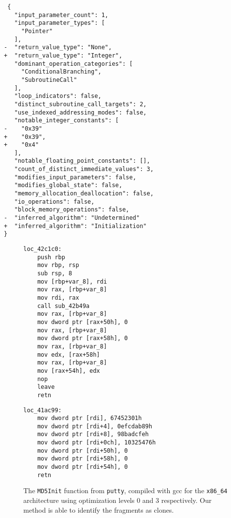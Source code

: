 \documentclass[conference,compsoc]{IEEEtran}
\begin{document}
\begin{verbatim}
 {
   "input_parameter_count": 1,
   "input_parameter_types": [
     "Pointer"
   ],
-  "return_value_type": "None",
+  "return_value_type": "Integer",
   "dominant_operation_categories": [
     "ConditionalBranching",
     "SubroutineCall"
   ],
   "loop_indicators": false,
   "distinct_subroutine_call_targets": 2,
   "use_indexed_addressing_modes": false,
   "notable_integer_constants": [
-    "0x39"
+    "0x39",
+    "0x4"
   ],
   "notable_floating_point_constants": [],
   "count_of_distinct_immediate_values": 3,
   "modifies_input_parameters": false,
   "modifies_global_state": false,
   "memory_allocation_deallocation": false,
   "io_operations": false,
   "block_memory_operations": false,
-  "inferred_algorithm": "Undetermined"
+  "inferred_algorithm": "Initialization"
}
\end{verbatim}


\begin{figure*}[!t]
\centering
\begin{minipage}[t]{0.48\linewidth}
\centering
\begin{verbatim}
loc_42c1c0:
    push rbp
    mov rbp, rsp
    sub rsp, 8
    mov [rbp+var_8], rdi
    mov rax, [rbp+var_8]
    mov rdi, rax
    call sub_42b49a
    mov rax, [rbp+var_8]
    mov dword ptr [rax+50h], 0
    mov rax, [rbp+var_8]
    mov dword ptr [rax+58h], 0
    mov rax, [rbp+var_8]
    mov edx, [rax+58h]
    mov rax, [rbp+var_8]
    mov [rax+54h], edx
    nop 
    leave 
    retn 
\end{verbatim}
\end{minipage}
\hfill
\begin{minipage}[t]{0.48\linewidth}
\centering
\begin{verbatim}
loc_41ac99:
    mov dword ptr [rdi], 67452301h
    mov dword ptr [rdi+4], 0efcdab89h
    mov dword ptr [rdi+8], 98badcfeh
    mov dword ptr [rdi+0ch], 10325476h
    mov dword ptr [rdi+50h], 0
    mov dword ptr [rdi+58h], 0
    mov dword ptr [rdi+54h], 0
    retn 
\end{verbatim}
\end{minipage}
\caption{The \texttt{MD5Init} function from \texttt{putty}, compiled with gcc for the 
    \texttt{x86\_64} architecture using optimization levels 0 and 3 respectively.
    Our method is able to identify the fragments as clones.}
\end{figure*}
\end{document}
